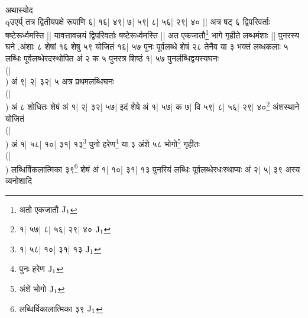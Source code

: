 \documentclass[12pt]{article}
\begin{document}
{अथास्योद \\qउएर्य्
तत्र द्वितीयपक्षे रूपाणि ६| १६| ४९| ७| ५९| ८| ५६| २९| ४० ||
अत्र षट् ६ द्विपरिवर्ताः षष्टेरूर्ध्वमस्ति ||
यावत्तावत्त्रयं द्विपरिवर्ताः षष्टेरूर्ध्वमस्ति ||
अत एकजातौ\footnote{{\s अतो एकजातौ }${\rm J_1}$}
भागे गृहीते लब्धमंशाः ||
पुनरस्य घने .अंशाः ८ शेषां १६ शेषु ५९ योजितं
१६| ५७ पुनः पूर्वलब्धे शेषं २८ तेनैव या ३
भक्तं लब्धकलाः ५ लब्धिः पूर्वलब्धेरदस्थोपित अं २
क ५ पुनरत्र शिष्ठं १| ५७ पुनर्लब्धिद्वयस्यघनः\\(|\\)
अं ९| २| ३२| ५ अत्र प्रथमलब्धिघनः\\(|\\)
अं ८ शोधितः शेषं अं १| २| ३२| ५७|
इदं शेषे अं १| ५७| क ७| वि ५९| ८| ५६| २९| ४०\footnote{{\s १| ५७| %
८| ५६| २९| ४० } ${\rm J_1}$}
अंशस्थाने योजितं \\(|\\) अं १| ५८| १०| ३१| १३\footnote{{\s १| ५८| %
 १०| ३१| १३} ${\rm J_1}$}
पुनो हरेण\footnote{{\s पुनः हरेण} ${\rm J_1}$}
या ३ अंशे ५८ भोगो\footnote{{\s अंशे भोगो  }${\rm J_1}$}
गृहीतः \\(|\\)
लब्धिर्विकलात्मिका ३९\footnote{{\s लब्धिर्विकालात्मिका ३९ } ${\rm J_1}$}
शेषं अं १| १०| ३१| १३ पुनरियं लब्धिः पूर्वलब्धेरधःस्थाप्यः
अं २| ५| ३९
अस्य व्यनोशादि}



 
\end{document}
